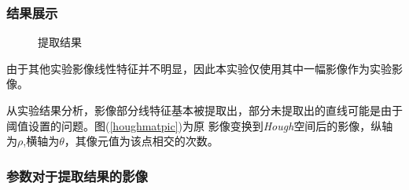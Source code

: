     \subsubsection{结果展示}
    
    \begin{figure}[H]
        \centering
        \caption{提取结果}
        \label{hough_result}
    \end{figure}

    由于其他实验影像线性特征并不明显，因此本实验仅使用其中一幅影像作为实验影像。

    从实验结果分析，影像部分线特征基本被提取出，部分未提取出的直线可能是由于阈值设置的问题。图(\ref{houghmatpic})为原
    影像变换到\textit{Hough}空间后的影像，纵轴为$\rho$,横轴为$\theta$，其像元值为该点相交的次数。

    \subsubsection{参数对于提取结果的影像}

